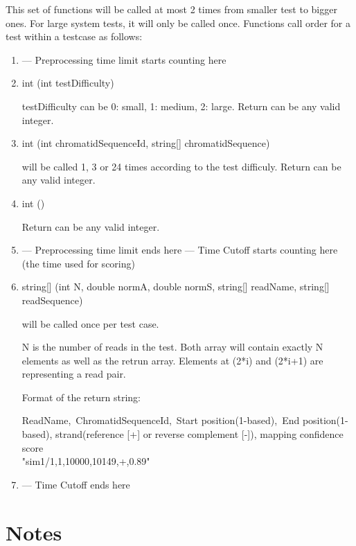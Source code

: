 \documentclass[hyperref,UTF8]{ctexart}
\theoremstyle{definition}
\theoremstyle{remark}
\numberwithin{equation}{subsection}
\begin{document}
	This set of functions will be called at most 2 times from smaller test to bigger ones.
	For large system tests, it will only be called once.
	Functions call order for a test within a testcase as follows:
	\begin{enumerate}
	
		\item --- Preprocessing time limit starts counting here
		
		\item int (int testDifficulty)
		
		testDifficulty can be 0: small, 1: medium, 2: large. Return can be any valid integer.
		
		\item int (int chromatidSequenceId, string[] chromatidSequence)
		
		will be called 1, 3 or 24 times according to the test difficuly. Return can be any valid integer.
		
		\item int ()
		
		Return can be any valid integer.
		
		\item --- Preprocessing time limit ends here
			  --- Time Cutoff starts counting here (the time used for scoring)
			
		\item string[] (int N, double normA, double normS, string[] readName, string[] readSequence)
		
		will be called once per test case.
		
		N is the number of reads in the test.
		Both array will contain exactly N elements as well as the retrun array.
		Elements at (2*i) and (2*i+1) are representing a read pair.
		
		Format of the return string:
		
		ReadName,\ ChromatidSequenceId,\ Start position(1-based),\ End position(1-based), strand(reference [+] or reverse complement [-]), mapping confidence score	\\
		"sim1/1,1,10000,10149,+,0.89"
		
		\item --- Time Cutoff ends here
			
	\end{enumerate}

\section{Notes}	
\label{sec:notes}
\end{document}
